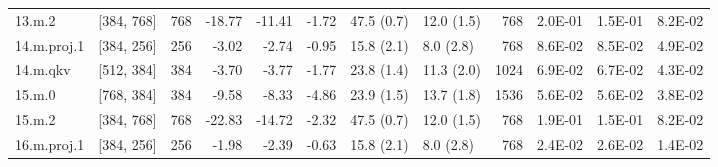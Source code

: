 \begin{table}
\begin{tabular}{llrrrrllrrrr}
13.m.2 & [384, 768] & 768 & {\cellcolor[HTML]{FEE695}} \color[HTML]{000000} -18.77 & {\cellcolor[HTML]{FFF7B2}} \color[HTML]{000000} -11.41 & {\cellcolor[HTML]{EEF8A8}} \color[HTML]{000000} -1.72 & 47.5 (0.7) & 12.0 (1.5) & 768 & {\cellcolor[HTML]{A50026}} \color[HTML]{F1F1F1} 2.0E-01 & {\cellcolor[HTML]{E95538}} \color[HTML]{F1F1F1} 1.5E-01 & {\cellcolor[HTML]{FEE491}} \color[HTML]{000000} 8.2E-02 \\
14.m.proj.1 & [384, 256] & 256 & {\cellcolor[HTML]{F2FAAE}} \color[HTML]{000000} -3.02 & {\cellcolor[HTML]{F1F9AC}} \color[HTML]{000000} -2.74 & {\cellcolor[HTML]{ECF7A6}} \color[HTML]{000000} -0.95 & 15.8 (2.1) & 8.0 (2.8) & 768 & {\cellcolor[HTML]{FEDE89}} \color[HTML]{000000} 8.6E-02 & {\cellcolor[HTML]{FEE08B}} \color[HTML]{000000} 8.5E-02 & {\cellcolor[HTML]{F7FCB4}} \color[HTML]{000000} 4.9E-02 \\
14.m.qkv & [512, 384] & 384 & {\cellcolor[HTML]{F4FAB0}} \color[HTML]{000000} -3.70 & {\cellcolor[HTML]{F4FAB0}} \color[HTML]{000000} -3.77 & {\cellcolor[HTML]{EEF8A8}} \color[HTML]{000000} -1.77 & 23.8 (1.4) & 11.3 (2.0) & 1024 & {\cellcolor[HTML]{FFF1A8}} \color[HTML]{000000} 6.9E-02 & {\cellcolor[HTML]{FFF2AA}} \color[HTML]{000000} 6.7E-02 & {\cellcolor[HTML]{EEF8A8}} \color[HTML]{000000} 4.3E-02 \\
15.m.0 & [768, 384] & 384 & {\cellcolor[HTML]{FFFBB8}} \color[HTML]{000000} -9.58 & {\cellcolor[HTML]{FFFDBC}} \color[HTML]{000000} -8.33 & {\cellcolor[HTML]{F7FCB4}} \color[HTML]{000000} -4.86 & 23.9 (1.5) & 13.7 (1.8) & 1536 & {\cellcolor[HTML]{FFFEBE}} \color[HTML]{000000} 5.6E-02 & {\cellcolor[HTML]{FFFEBE}} \color[HTML]{000000} 5.6E-02 & {\cellcolor[HTML]{E8F59F}} \color[HTML]{000000} 3.8E-02 \\
15.m.2 & [384, 768] & 768 & {\cellcolor[HTML]{FEDA86}} \color[HTML]{000000} -22.83 & {\cellcolor[HTML]{FEEFA3}} \color[HTML]{000000} -14.72 & {\cellcolor[HTML]{EFF8AA}} \color[HTML]{000000} -2.32 & 47.5 (0.7) & 12.0 (1.5) & 768 & {\cellcolor[HTML]{C01A27}} \color[HTML]{F1F1F1} 1.9E-01 & {\cellcolor[HTML]{EC5C3B}} \color[HTML]{F1F1F1} 1.5E-01 & {\cellcolor[HTML]{FEE491}} \color[HTML]{000000} 8.2E-02 \\
16.m.proj.1 & [384, 256] & 256 & {\cellcolor[HTML]{EFF8AA}} \color[HTML]{000000} -1.98 & {\cellcolor[HTML]{F1F9AC}} \color[HTML]{000000} -2.39 & {\cellcolor[HTML]{EBF7A3}} \color[HTML]{000000} -0.63 & 15.8 (2.1) & 8.0 (2.8) & 768 & {\cellcolor[HTML]{D5ED88}} \color[HTML]{000000} 2.4E-02 & {\cellcolor[HTML]{D9EF8B}} \color[HTML]{000000} 2.6E-02 & {\cellcolor[HTML]{C3E67D}} \color[HTML]{000000} 1.4E-02 \\

\end{tabular}
\end{table}
